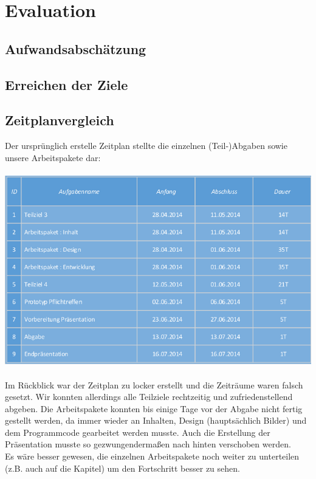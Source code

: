 \documentclass[a4paper]{article}
\begin{document}
\pagebreak

\section{Evaluation}
    \subsection{Aufwandsabschätzung}
    \subsection{Erreichen der Ziele}
    \subsection{Zeitplanvergleich}
        Der ursprünglich erstelle Zeitplan stellte die einzelnen (Teil-)Abgaben sowie unsere Arbeitspakete dar:\\\\
        \includegraphics[width=\linewidth]{zeitplan_1}\\\\
        Im Rückblick war der Zeitplan zu locker erstellt und die Zeiträume waren falsch gesetzt. Wir konnten allerdings alle Teilziele rechtzeitig und zufriedenstellend abgeben. Die Arbeitspakete konnten bis einige Tage vor der Abgabe nicht fertig gestellt werden, da immer wieder an Inhalten, Design (hauptsächlich Bilder) und dem Programmcode gearbeitet werden musste. Auch die Erstellung der Präsentation musste so gezwungendermaßen nach hinten verschoben werden.\\
        Es wäre besser gewesen, die einzelnen Arbeitspakete noch weiter zu unterteilen (z.B. auch auf die Kapitel) um den Fortschritt besser zu sehen.

\end{document}
